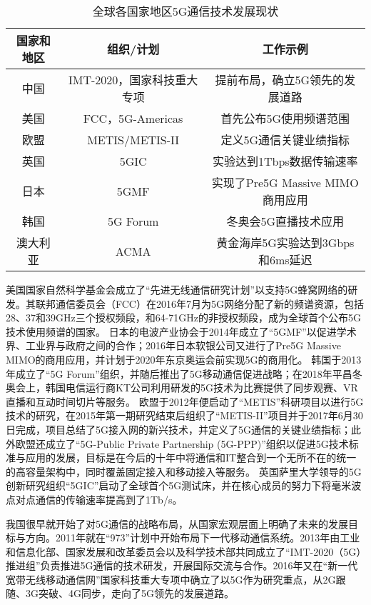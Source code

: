 \begin{table}[htbp]
	\caption{全球各国家地区5G通信技术发展现状}
	\label{table1}
	\centering
	\small
	\begin{tabular}{|c|c|c|}
	\hline
	\textbf{国家和地区} & \textbf{组织/计划}    & \textbf{工作示例}             \\ \hline
	中国             & IMT-2020，国家科技重大专项 & 提前布局，确立5G领先的发展道路          \\ \hline
	美国             & FCC，5G-Americas  & 首先公布5G使用频谱范围              \\ \hline
	欧盟             & METIS/METIS-II    & 定义5G通信关键业绩指标              \\ \hline
	英国             & 5GIC              & 实验达到1Tbps数据传输速率           \\ \hline
	日本             & 5GMF              & 实现了Pre5G Massive MIMO商用应用 \\ \hline
	韩国             & 5G Forum          & 冬奥会5G直播技术应用               \\ \hline
	澳大利亚           & ACMA              & 黄金海岸5G实验达到3Gbps和6ms延迟     \\ \hline
	\end{tabular}
\end{table}


美国国家自然科学基金会成立了“先进无线通信研究计划”以支持5G蜂窝网络的研发。其联邦通信委员会（FCC）在2016年7月为5G网络分配了新的频谱资源，包括28、37和39GHz三个授权频段，和64-71GHz的非授权频段，成为全球首个公布5G技术使用频谱的国家。
日本的电波产业协会于2014年成立了“5GMF”以促进学术界、工业界与政府之间的合作；2016年日本软银公司又进行了Pre5G Massive MIMO的商用应用，并计划于2020年东京奥运会前实现5G的商用化。
韩国于2013年成立了“5G Forum”组织，并随后推出了5G移动通信促进战略；在2018年平昌冬奥会上，韩国电信运行商KT公司利用研发的5G技术为比赛提供了同步观赛、VR直播和互动时间切片等服务。
欧盟于2012年便启动了“METIS”科研项目以进行5G技术的研究，在2015年第一期研究结束后组织了“METIS-II”项目并于2017年6月30日完成，项目总结了5G接入网的新兴技术，并定义了5G通信的关键业绩指标；此外欧盟还成立了“5G-Public Private Partnership (5G-PPP)”组织以促进5G技术标准与应用的发展，目标是在今后的十年中将通信和IT整合到一个无所不在的统一的高容量架构中，同时覆盖固定接入和移动接入等服务。
英国萨里大学领导的5G创新研究组织“5GIC”启动了全球首个5G测试床，并在核心成员的努力下将毫米波点对点通信的传输速率提高到了1Tb/s。

我国很早就开始了对5G通信的战略布局，从国家宏观层面上明确了未来的发展目标与方向。2011年就在“973”计划中开始布局下一代移动通信系统。2013年由工业和信息化部、国家发展和改革委员会以及科学技术部共同成立了“IMT-2020（5G）推进组”负责推进5G通信的技术研发，开展国际交流与合作。2016年又在“新一代宽带无线移动通信网”国家科技重大专项中确立了以5G作为研究重点，从2G跟随、3G突破、4G同步，走向了5G领先的发展道路。

